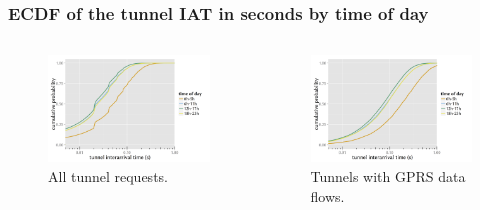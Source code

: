 \documentclass{beamer}
\begin{document}
\begin{frame}
	\frametitle{ECDF of the tunnel IAT in seconds by time of day}
	\begin{columns}
		\begin{figure}
			\includegraphics[width=0.7\columnwidth]{extras/R-IAT-successful-2h-ecdfs.png}
			\vspace{-4mm}
			\caption{All tunnel requests.}
		\end{figure}
		\vspace{-10mm}
		\begin{figure}
			\includegraphics[width=0.7\columnwidth]{extras/R-IAT-fromflows-gprs-ecdfs-2h.png}
			\vspace{-4mm}
			\caption{Tunnels with GPRS data flows.}
		\end{figure}


\end{columns}
\end{frame}
\end{document}
